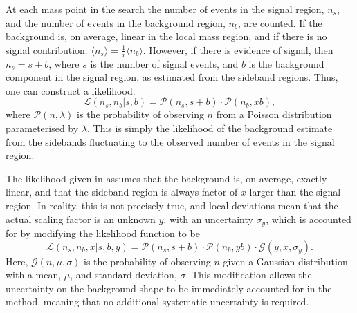 At each mass point in the search the number of events in the signal region, $n_s$, and the number
of events in the background region, $n_b$, are counted.
If the background is, on average, linear in the local mass region, and if there is no signal
contribution: $\langle n_s\rangle=\tfrac1x\langle n_b\rangle$.
However, if there is evidence of signal, then $n_s=s+b$, where $s$ is the
number of signal events, and $b$ is the background component in the signal region, as
estimated from the sideband regions.
Thus, one can construct a likelihood:
\begin{equation}
  \mathcal{L}(n_s, n_b | s, b) =
  \mathcal{P}(n_s, s+b) \cdot
  \mathcal{P}(n_b, xb),
  \label{eq:db:like1}
\end{equation}
where $\mathcal{P}(n, \lambda)$ is the probability of observing $n$ from a Poisson distribution
parameterised by $\lambda$.
This is simply the likelihood of the background estimate from the sidebands fluctuating to
the observed number of events in the signal region.

The likelihood given in  assumes that the background is, on average, exactly
linear, and that the sideband region is always factor of $x$ larger than the
signal region.
In reality, this is not precisely true, and local deviations mean that the actual scaling factor is
an unknown $y$, with an uncertainty $\sigma_y$, which is accounted for by
modifying the likelihood function to be
\begin{equation}
  \mathcal{L}(n_s, n_b, x | s, b, y) =
  \mathcal{P}(n_s, s+b) \cdot
  \mathcal{P}(n_b, yb) \cdot
  \mathcal{G}(y,x,\sigma_y).
  \label{eq:db:like2}
\end{equation}
Here, $\mathcal{G}(n, \mu, \sigma)$ is the probability of observing $n$ given a Gaussian
distribution with a mean, $\mu$, and standard deviation, $\sigma$.
This modification allows the uncertainty on the background shape to be immediately accounted for in
the method, meaning that no additional systematic uncertainty is required.

